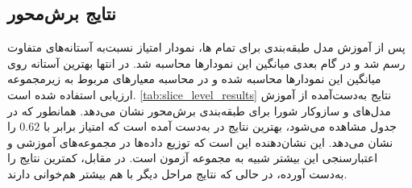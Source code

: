 \subsection{نتایج برش‌محور }
پس از آموزش مدل طبقه‌بندی برای تمام 
ها،
نمودار امتیاز
نسبت‌به آستانه‌های متفاوت رسم شد و در گام بعدی میانگین این نمودارها محاسبه شد. در انتها بهترین آستانه روی میانگین این نمودار‌ها محاسبه شده و در محاسبه معیارهای مربوط به زیرمجموعه ارزیابی استفاده شده است.
 \autoref{tab:slice_level_results}
  نتایج به‌دست‌آمده از آموزش مدل‌های  و سازوکار شورا برای طبقه‌بندی برش‌محور نشان می‌دهد. همانطور که در جدول مشاهده می‌شود، بهترین نتایج در
  به‌دست آمده است که امتیاز 
   برابر با
  $0.62$
 را نشان می‌دهد. این نشان‌دهنده این است که توزیع داده‌ها در مجموعه‌های آموزشی و اعتبارسنجی این 
  بیشتر شبیه به مجموعه آزمون است. در مقابل، 
   کمترین نتایج را به‌دست آورده، در حالی که نتایج مراحل دیگر با هم بیشتر هم‌خوانی دارند.


\begin{table}[h]
\centering
\caption{نتایج برش‌محور مدل 
برای آستانه تصمیم‌گیری
$0.27$}
\label{tab:slice_level_results}
\end{table}



